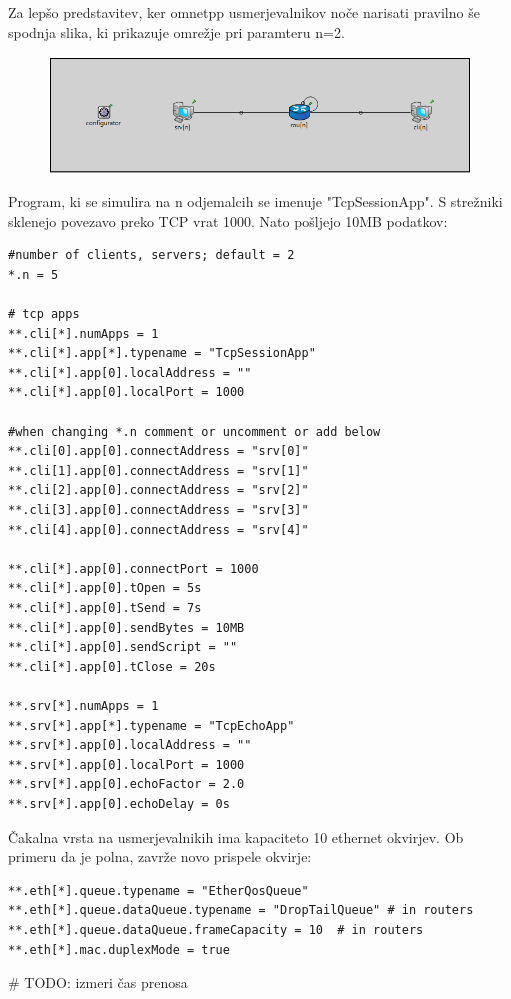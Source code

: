 \documentclass[11pt,a4paper,slovene]{myarticle}
\begin{document}
Za lepšo predstavitev, ker omnetpp usmerjevalnikov noče narisati pravilno še spodnja slika, ki prikazuje omrežje pri paramteru n=2.

\begin{figure}[h]
  \includegraphics[width=\linewidth]{omrezje4_n_eq_2.png}
\end{figure}

Program, ki se simulira na n odjemalcih se imenuje "TcpSessionApp". S strežniki sklenejo povezavo preko TCP vrat 1000. Nato pošljejo 10MB podatkov:
\begin{lstlisting}[h]
#number of clients, servers; default = 2
*.n = 5

# tcp apps
**.cli[*].numApps = 1
**.cli[*].app[*].typename = "TcpSessionApp"
**.cli[*].app[0].localAddress = ""
**.cli[*].app[0].localPort = 1000

#when changing *.n comment or uncomment or add below
**.cli[0].app[0].connectAddress = "srv[0]"
**.cli[1].app[0].connectAddress = "srv[1]"
**.cli[2].app[0].connectAddress = "srv[2]"
**.cli[3].app[0].connectAddress = "srv[3]"
**.cli[4].app[0].connectAddress = "srv[4]"

**.cli[*].app[0].connectPort = 1000
**.cli[*].app[0].tOpen = 5s
**.cli[*].app[0].tSend = 7s
**.cli[*].app[0].sendBytes = 10MB
**.cli[*].app[0].sendScript = ""
**.cli[*].app[0].tClose = 20s

**.srv[*].numApps = 1
**.srv[*].app[*].typename = "TcpEchoApp"
**.srv[*].app[0].localAddress = ""
**.srv[*].app[0].localPort = 1000
**.srv[*].app[0].echoFactor = 2.0
**.srv[*].app[0].echoDelay = 0s
\end{lstlisting}

Čakalna vrsta na usmerjevalnikih ima kapaciteto 10 ethernet okvirjev. Ob primeru da je polna, zavrže novo prispele okvirje:
\begin{lstlisting}[h]
**.eth[*].queue.typename = "EtherQosQueue"
**.eth[*].queue.dataQueue.typename = "DropTailQueue" # in routers
**.eth[*].queue.dataQueue.frameCapacity = 10  # in routers
**.eth[*].mac.duplexMode = true
\end{lstlisting}

# TODO: izmeri čas prenosa
\end{document}
